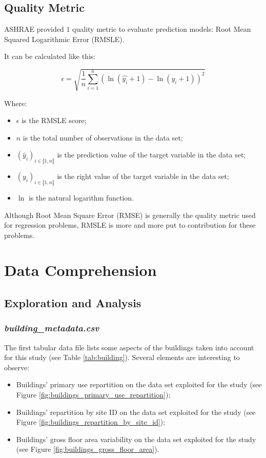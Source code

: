 \documentclass[twocolumn, switch]{article}
\begin{document}
\subsection{Quality Metric} \label{sub:quality_metric}

ASHRAE provided $1$ quality metric to evaluate prediction models: Root Mean Squared Logarithmic Error (RMSLE).

It can be calculated like this:

$$\epsilon = \sqrt{\frac{1}{n} \sum_{i = 1}^{n} \left(\ln(\hat{y_{i}} + 1) - \ln(y_{i} + 1)\right)^{2}}$$

Where:
\begin{itemize}
\item $\epsilon$ is the RMSLE score;
\item $n$ is the total number of observations in the data set;
\item $\left(\hat{y}_{i}\right)_{i \in \llbracket 1, n \rrbracket}$ is the prediction value of the target variable in the data set;
\item $\left(y_{i}\right)_{i \in \llbracket 1, n \rrbracket}$ is the right value of the target variable in the data set;
\item $\ln$ is the natural logarithm function.
\end{itemize}

Although Root Mean Square Error (RMSE) is generally the quality metric used for regression problems, RMSLE is more and more put to contribution for these problems.


\section{Data Comprehension}

\subsection{Exploration and Analysis}

\subsubsection{\textit{building\_metadata.csv}}

The first tabular data file lists some aspects of the buildings taken into account for this study (see Table \ref{tab:building}). Several elements are interesting to observe:

\begin{itemize}
\item Buildings' primary use repartition on the data set exploited for the study (see Figure \ref{fig:buildings_primary_use_repartition});
\item Buildings' repartition by site ID on the data set exploited for the study (see Figure \ref{fig:buildings_repartition_by_site_id});
\item Buildings' gross floor area variability on the data set exploited for the study (see Figure \ref{fig:buildings_gross_floor_area}).
\end{itemize}
\end{document}
